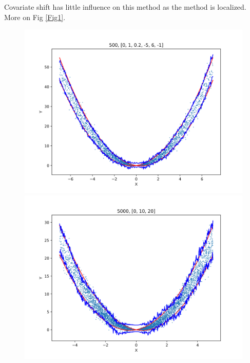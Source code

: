 \documentclass[12pt, a4paper, oneside]{article}
\begin{document}
    Covariate shift has little influence on this method as the method is localized. More on Fig \ref{Fig1}.
    \begin{figure}[htbp]
        \centering
        \begin{minipage}{0.495\linewidth}
            \centering
            \includegraphics[width=0.98\linewidth]{fig/Ex1_1/0_1_.png}
        \end{minipage}
        \begin{minipage}{0.495\linewidth}
            \centering
            \includegraphics[width=0.98\linewidth]{fig/Ex1_1/0_10_20.png}
        \end{minipage}
        \centering
        \begin{minipage}{0.495\linewidth}

\end{minipage}
\end{figure}
\end{document}
